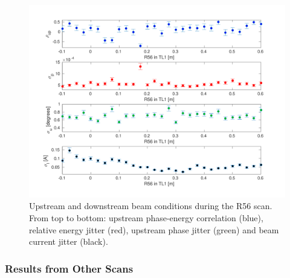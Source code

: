 \begin{figure}
  \centering
  \includegraphics[width=\textwidth]{Figures/propagation/r56Scan_upstreamParams}
  \caption{Upstream and downstream beam conditions during the R56 scan. From top to bottom: upstream phase-energy correlation (blue), relative energy jitter (red), upstream phase jitter (green) and beam current jitter (black).}
  \label{f:r56Scan_upstreamParams}
\end{figure}

\subsubsection{Results from Other Scans}

